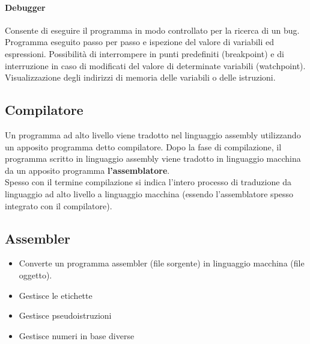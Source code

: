 \documentclass[12pt, a4paper, openany]{book}
\begin{document}
\paragraph*{Debugger}
Consente di eseguire il programma in modo controllato per la ricerca di un bug.
Programma eseguito passo per passo e ispezione del valore di variabili ed espressioni.
Possibilità di interrompere in punti predefiniti (breakpoint) e di interruzione in caso di modificati
del valore di determinate variabili (watchpoint). Visualizzazione degli indirizzi di memoria
delle variabili o delle istruzioni.

\subsection{Compilatore}
Un programma ad alto livello viene tradotto nel linguaggio assembly utilizzando un
apposito programma detto compilatore. Dopo la fase di compilazione, il programma scritto
in linguaggio assembly viene tradotto in linguaggio macchina da un apposito programma \textbf{l'assemblatore}.
\\ Spesso con il termine compilazione si indica l'intero processo di traduzione da linguaggio
ad alto livello a linguaggio macchina (essendo l'assemblatore spesso integrato con il compilatore).

\subsection{Assembler}
\begin{itemize}
    \item Converte un programma assembler (file sorgente) in linguaggio macchina (file oggetto).
    \item Gestisce le etichette
    \item Gestisce pseudoistruzioni
    \item Gestisce numeri in base diverse
\end{itemize}
\end{document}
